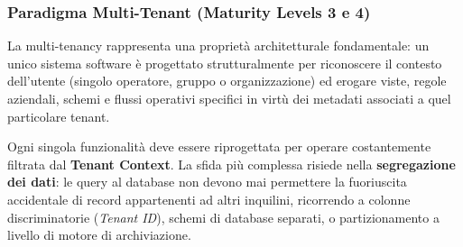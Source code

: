 \documentclass[11pt, a4paper]{article}
\begin{document}
\subsubsection{Paradigma Multi-Tenant (Maturity Levels 3 e 4)}
La multi-tenancy rappresenta una proprietà architetturale fondamentale: un unico sistema software è progettato strutturalmente per riconoscere il contesto dell'utente (singolo operatore, gruppo o organizzazione) ed erogare viste, regole aziendali, schemi e flussi operativi specifici in virtù dei metadati associati a quel particolare tenant.

Ogni singola funzionalità deve essere riprogettata per operare costantemente filtrata dal \textbf{Tenant Context}. La sfida più complessa risiede nella \textbf{segregazione dei dati}: le query al database non devono mai permettere la fuoriuscita accidentale di record appartenenti ad altri inquilini, ricorrendo a colonne discriminatorie (\emph{Tenant ID}), schemi di database separati, o partizionamento a livello di motore di archiviazione.
\end{document}

